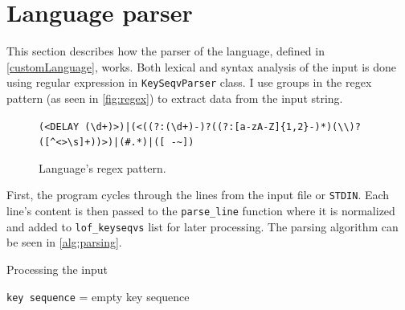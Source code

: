 \section{Language parser}
This section describes how the parser of the language, defined in \autoref{customLanguage}, works. Both lexical and syntax analysis of the input is done using regular expression in \verb|KeySeqvParser| class. I use groups in the regex pattern (as seen in \autoref{fig:regex}) to extract data from the input string.
\begin{figure}[ht]
\centering
\begin{varwidth}{\linewidth}
\footnotesize
\verb=(<DELAY (\d+)>)|(<((?:(\d+)-)?((?:[a-zA-Z]{1,2}-)*)(\\)?([^<>\s]+))>)|(#.*)|([ -~])=
\end{varwidth}
\caption{Language's regex pattern.}
\label{fig:regex}
\end{figure}
First, the program cycles through the lines from the input file or \verb|STDIN|. Each line's content is then passed to the \verb|parse_line| function where it is normalized and added to \verb|lof_keyseqvs| list for later processing. The parsing algorithm can be seen in \autoref{alg:parsing}.
\begin{algorithm}
\caption{Processing the input}
\label{alg:parsing}
\texttt{key sequence} = empty key sequence\;
\end{algorithm}

